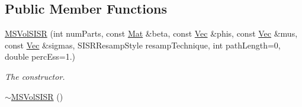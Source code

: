 \subsection*{Public Member Functions}
\begin{DoxyCompactItemize}
\item 
\hyperlink{classMSVolSISR_a036830dc21a366c40a083ddf4c3344ae}{M\+S\+Vol\+S\+I\+SR} (int num\+Parts, const \hyperlink{pmfs_8h_ae601f56a556993079f730483c574356f}{Mat} \&beta, const \hyperlink{pmfs_8h_a4c7df05c6f5e8a0d15ae14bcdbc07152}{Vec} \&phis, const \hyperlink{pmfs_8h_a4c7df05c6f5e8a0d15ae14bcdbc07152}{Vec} \&mus, const \hyperlink{pmfs_8h_a4c7df05c6f5e8a0d15ae14bcdbc07152}{Vec} \&sigmas, S\+I\+S\+R\+Resamp\+Style resamp\+Technique, int path\+Length=0, double perc\+Ess=1.)
\begin{DoxyCompactList}\small\item\em The constructor. \end{DoxyCompactList}\item 
\hyperlink{classMSVolSISR_a5e1706e6f5ea33e9c3cf7a1d58485690}{$\sim$\+M\+S\+Vol\+S\+I\+SR} ()\hypertarget{classMSVolSISR_a5e1706e6f5ea33e9c3cf7a1d58485690}{}\label{classMSVolSISR_a5e1706e6f5ea33e9c3cf7a1d58485690}


\end{DoxyCompactItemize}
